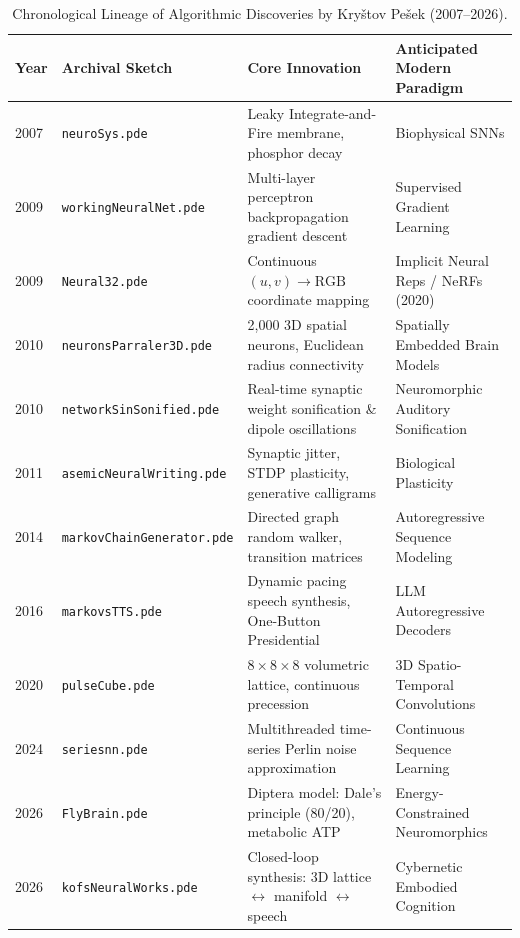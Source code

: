\documentclass[10pt,twocolumn,a4paper]{article}
\begin{document}
\begin{table}[t]
\centering
\scriptsize
\caption{Chronological Lineage of Algorithmic Discoveries by Kry\v{s}tov Pe\v{s}ek (2007--2026).}
\label{tab:lineage}
\begin{tabular}{@{}llll@{}}
\toprule
\textbf{Year} & \textbf{Archival Sketch} & \textbf{Core Innovation} & \textbf{Anticipated Modern Paradigm} \\ \midrule
2007 & \texttt{neuroSys.pde} & Leaky Integrate-and-Fire membrane, phosphor decay & Biophysical SNNs \\
2009 & \texttt{workingNeuralNet.pde} & Multi-layer perceptron backpropagation gradient descent & Supervised Gradient Learning \\
2009 & \texttt{Neural32.pde} & Continuous $(u, v) \to \text{RGB}$ coordinate mapping & Implicit Neural Reps / NeRFs (2020) \\
2010 & \texttt{neuronsParraler3D.pde} & 2,000 3D spatial neurons, Euclidean radius connectivity & Spatially Embedded Brain Models \\
2010 & \texttt{networkSinSonified.pde} & Real-time synaptic weight sonification \& dipole oscillations & Neuromorphic Auditory Sonification \\
2011 & \texttt{asemicNeuralWriting.pde} & Synaptic jitter, STDP plasticity, generative calligrams & Biological Plasticity \\
2014 & \texttt{markovChainGenerator.pde} & Directed graph random walker, transition matrices & Autoregressive Sequence Modeling \\
2016 & \texttt{markovsTTS.pde} & Dynamic pacing speech synthesis, One-Button Presidential & LLM Autoregressive Decoders \\
2020 & \texttt{pulseCube.pde} & $8\times 8\times 8$ volumetric lattice, continuous precession & 3D Spatio-Temporal Convolutions \\
2024 & \texttt{seriesnn.pde} & Multithreaded time-series Perlin noise approximation & Continuous Sequence Learning \\
2026 & \texttt{FlyBrain.pde} & Diptera model: Dale's principle (80/20), metabolic ATP & Energy-Constrained Neuromorphics \\
2026 & \texttt{kofsNeuralWorks.pde} & Closed-loop synthesis: 3D lattice $\leftrightarrow$ manifold $\leftrightarrow$ speech & Cybernetic Embodied Cognition \\ \bottomrule
\end{tabular}
\end{table}
\end{document}

